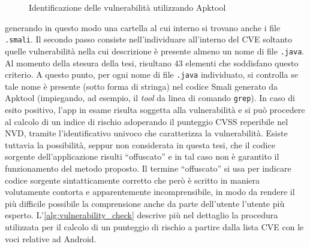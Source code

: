 \documentclass[12pt,a4paper,oneside]{article}
\begin{document}
\begin{figure}[!htb]
    \caption{Identificazione delle vulnerabilità utilizzando Apktool}\label{fig:apktool}
\end{figure}
generando in questo modo una cartella al cui interno si trovano anche i file \texttt{.smali}. Il secondo passo consiste nell'individuare all'interno del \gls{CVE} soltanto quelle vulnerabilità nella cui descrizione è presente almeno un nome di file \texttt{.java}. Al momento della stesura della tesi, risultano $43$ elementi che soddisfano questo criterio. A questo punto, per ogni nome di file \texttt{.java} individuato, si controlla se tale nome è presente (sotto forma di stringa) nel codice Smali generato da Apktool (impiegando, ad esempio, il \textit{tool} da linea di comando \texttt{grep}). In caso di esito positivo, l'app in esame risulta soggetta alla vulnerabilità e si può procedere al calcolo di un indice di rischio adoperando il punteggio \gls{CVSS} reperibile nel \gls{NVD}, tramite l'identificativo univoco che caratterizza la vulnerabilità. Esiste tuttavia la possibilità, seppur non considerata in questa tesi, che il codice sorgente dell'applicazione risulti ``offuscato'' e in tal caso non è garantito il funzionamento del metodo proposto. Il termine ``offuscato'' si usa per indicare codice sorgente sintatticamente corretto che però è scritto in maniera volutamente contorta e apparentemente incomprensibile, in modo da rendere il più difficile possibile la comprensione anche da parte dell'utente l'utente più esperto. L'\cref{alg:vulnerability_check} descrive più nel dettaglio la procedura utilizzata per il calcolo di un punteggio di rischio a partire dalla lista \gls{CVE} con le voci relative ad Android.
\end{document}
